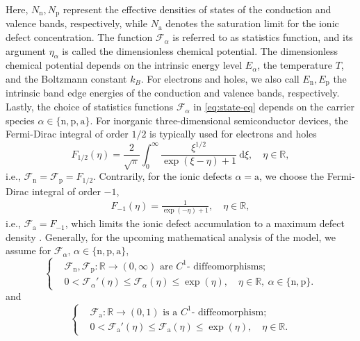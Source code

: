 \documentclass[10pt,a4paper, final]{article}
\def\electrons{\text{n}}
\def\holes{\text{p}}
\def\ions{\text{a}}
\theoremstyle{definition}								%
\numberwithin{equation}{section}
\numberwithin{figure}{section}
\numberwithin{theorem}{section}
\begin{document}
Here, $N_\electrons, N_\holes$ represent the effective densities of states of the conduction and valence bands, respectively, while $N_\ions$ denotes the saturation limit for the ionic defect concentration.
The function $\mathcal{F}_\alpha$ is referred to as statistics function, and its argument $\eta_\alpha$ is called the dimensionless chemical potential.
The dimensionless chemical potential depends on the intrinsic energy level $E_\alpha$, the temperature $T$, and the Boltzmann constant $k_B$.
For electrons and holes, we also call $E_\electrons, E_\holes$ the intrinsic band edge energies of the conduction and valence bands, respectively.
Lastly, the choice of statistics functions $\mathcal{F}_\alpha$ in \eqref{eq:state-eq} depends on the carrier species $\alpha\in\{\electrons, \holes, \ions\}$.
For inorganic three-dimensional semiconductor devices, the Fermi-Dirac integral of order $1/2$ is typically used for electrons and holes
\begin{equation} \label{eq:Fermi-Dirac}
    F_{1/2}(\eta) = \frac{2}{ \sqrt{\pi} } \int_{0}^{\infty} \frac{\xi^{1/2}}{\exp(\xi - \eta) + 1}\: \mathrm{d}\xi, \quad\eta \in \mathbb{R},
\end{equation}
i.e., $\mathcal{F}_\electrons = \mathcal{F}_\holes = F_{1/2}$.
Contrarily, for the ionic defects $\alpha = \ions$, we choose the Fermi-Dirac integral of order $-1$,
\begin{align} \label{eq:FD-1-statistics}
    F_{-1}(\eta) = \frac{1}{  \exp(-\eta) + 1}, \quad \eta \in \mathbb{R},
\end{align}
i.e., $\mathcal{F}_\ions = F_{-1}$, which limits the ionic defect accumulation to a maximum defect density \cite{Abdel.2021, Abdel.2023}.
Generally, for the upcoming mathematical analysis of the model, we assume for $\mathcal{F}_\alpha$, $\alpha\in\{\electrons, \holes, \ions\}$,
\begin{equation}\tag{H1} \label{hyp:statistics-n-p}
    \left\{
    \begin{aligned}
        &\mathcal{F}_\electrons, \mathcal{F}_\holes: \mathbb{R} \rightarrow (0,\infty)\text{ are }  C^1\text{- diffeomorphisms};\\[.5em]
        &0 < \mathcal{F}_\alpha'(\eta) \leq \mathcal{F}_\alpha(\eta) \leq \exp(\eta), \quad\eta \in \mathbb{R},\ \alpha \in\{\electrons, \holes\} .
    \end{aligned}
    \right.
\end{equation}
and
\begin{equation}\tag{H2} \label{hyp:statistics-a}
    \left\{
    \begin{aligned}
        &\mathcal{F}_\ions: \mathbb{R} \rightarrow (0,1)\text{ is a }  C^1\text{- diffeomorphism};\\[.5em]
        &0 < \mathcal{F}_\ions'(\eta) \leq \mathcal{F}_\ions(\eta) \leq \exp(\eta), \quad\eta \in \mathbb{R}.
    \end{aligned}
    \right.
\end{equation}
\end{document}
